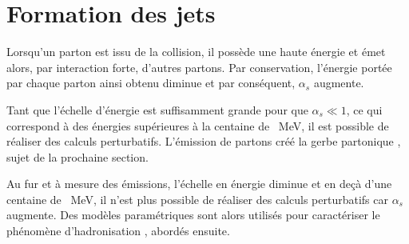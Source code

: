 \section{Formation des jets}\label{chapter-JERC-section-jets}
Lorsqu'un parton est issu de la collision, il possède une haute énergie et émet alors, par interaction forte, d'autres partons.
Par conservation, l'énergie portée par chaque parton ainsi obtenu diminue et par conséquent, $\alpha_s$ augmente.
\par Tant que l'échelle d'énergie est suffisamment grande pour que $\alpha_s \ll 1$, ce qui correspond à des énergies supérieures à la centaine de \SI{}{\MeV}, il est possible de réaliser des calculs perturbatifs.
L'émission de partons créé la \og gerbe partonique \fg, sujet de la prochaine section.
\par Au fur et à mesure des émissions, l'échelle en énergie diminue et en deçà d'une centaine de \SI{}{\MeV}, il n'est plus possible de réaliser des calculs perturbatifs car $\alpha_s$ augmente.
Des modèles paramétriques sont alors utilisés pour caractériser le phénomène d'\og hadronisation \fg, abordés ensuite.

